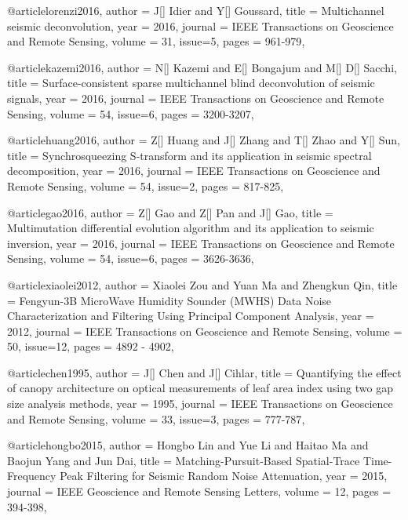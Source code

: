 @article{lorenzi2016,
  author =	 {J[] Idier and Y[] Goussard},
  title =	 {Multichannel seismic deconvolution},
  year =	 2016,
  journal =	 {IEEE Transactions on Geoscience and Remote Sensing},
  volume =	 31,
  issue=5,
  pages =	 {961-979},
}

@article{kazemi2016,
  author =	 {N[] Kazemi and E[] Bongajum and M[] D[] Sacchi},
  title =	 {Surface-consistent sparse multichannel blind deconvolution of seismic signals},
  year =	 2016,
  journal =	 {IEEE Transactions on Geoscience and Remote Sensing},
  volume =	 54,
  issue=6,
  pages =	 {3200-3207},
}

@article{huang2016,
  author =	 {Z[] Huang and J[] Zhang and T[] Zhao and Y[] Sun},
  title =	 {Synchrosqueezing {S}-transform and its application in seismic spectral decomposition},
  year =	 2016,
  journal =	 {IEEE Transactions on Geoscience and Remote Sensing},
  volume =	 54,
  issue=2,
  pages =	 {817-825},
}

@article{gao2016,
  author =	 {Z[] Gao and Z[] Pan and J[] Gao},
  title =	 {Multimutation differential evolution algorithm and its application to seismic inversion},
  year =	 2016,
  journal =	 {IEEE Transactions on Geoscience and Remote Sensing},
  volume =	 54,
  issue=6,
  pages =	 {3626-3636},
}







@article{xiaolei2012,
  author =	 {Xiaolei Zou and Yuan Ma and Zhengkun Qin},
  title =	 {Fengyun-3B MicroWave Humidity Sounder (MWHS) Data Noise Characterization and Filtering Using Principal Component Analysis},
  year =	 2012,
  journal =	 {IEEE Transactions on Geoscience and Remote Sensing},
  volume =	 50,
  issue=12,
  pages =	 {4892 - 4902},
}

@article{chen1995,
  author =	 {J[] Chen and J[] Cihlar},
  title =	 {Quantifying the effect of canopy architecture on optical measurements of leaf area index using two gap size analysis methods},
  year =	 1995,
  journal =	 {IEEE Transactions on Geoscience and Remote Sensing},
  volume =	 33,
  issue=3,
  pages =	 {777-787},
}



@article{hongbo2015,
  author =	 {Hongbo Lin and Yue Li and Haitao Ma and Baojun Yang and Jun Dai},
  title =	 {Matching-Pursuit-Based Spatial-Trace Time-Frequency Peak Filtering for Seismic Random Noise Attenuation},
  year =	 2015,
  journal =	 {IEEE Geoscience and Remote Sensing Letters},
  volume =	 12,
  pages =	 {394-398},
}


